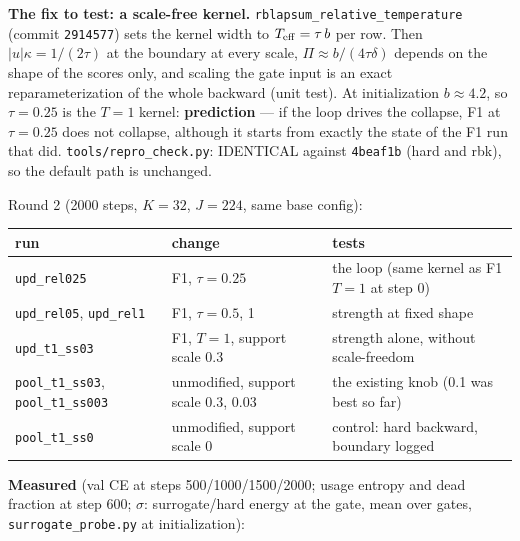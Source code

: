 \documentclass[11pt,a4paper]{article}
\newcommand{\code}[1]{\texttt{#1}}
\begin{document}
\textbf{The fix to test: a scale-free kernel.}  \code{rblapsum\_relative\_temperature} (commit \code{2914577}) sets
the kernel width to \(T_{\rm eff}=\tau\,b\) per row.  Then \(|u|\kappa=1/(2\tau)\) at the boundary at every scale,
\(\Pi\approx b/(4\tau\delta)\) depends on the shape of the scores only, and scaling the gate input is an exact
reparameterization of the whole backward (unit test).  At initialization \(b\approx4.2\), so \(\tau=0.25\) is the
\(T=1\) kernel: \textbf{prediction} --- if the loop drives the collapse, F1 at \(\tau=0.25\) does not collapse, although
it starts from exactly the state of the F1 run that did.  \code{tools/repro\_check.py}: IDENTICAL against
\code{4beaf1b} (hard and rbk), so the default path is unchanged.

Round 2 (2000 steps, \(K=32\), \(J=224\), same base config):

\begin{center}\small
\begin{tabular}{lll}
\toprule
run & change & tests \\
\midrule
\code{upd\_rel025} & F1, \(\tau=0.25\) & the loop (same kernel as F1 \(T=1\) at step 0) \\
\code{upd\_rel05}, \code{upd\_rel1} & F1, \(\tau=0.5\), 1 & strength at fixed shape \\
\code{upd\_t1\_ss03} & F1, \(T=1\), support scale 0.3 & strength alone, without scale-freedom \\
\code{pool\_t1\_ss03}, \code{pool\_t1\_ss003} & unmodified, support scale 0.3, 0.03 & the existing knob (0.1 was best so far) \\
\code{pool\_t1\_ss0} & unmodified, support scale 0 & control: hard backward, boundary logged \\
\bottomrule
\end{tabular}
\end{center}

\textbf{Measured} (val CE at steps 500/1000/1500/2000; usage entropy and dead fraction at step 600; \(\sigma\): surrogate/hard
energy at the gate, mean over gates, \code{surrogate\_probe.py} at initialization):
\end{document}
